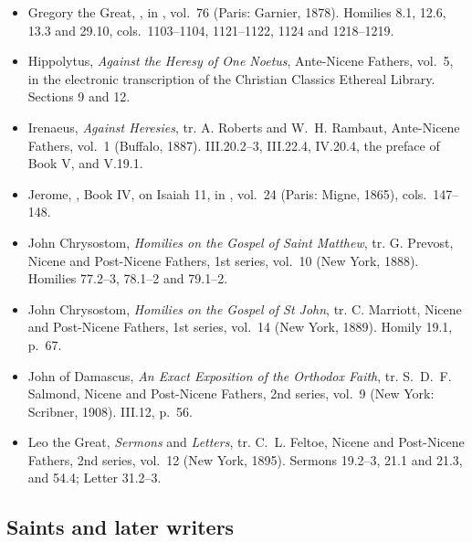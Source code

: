 \begin{itemize}[leftmargin=1.3em, itemsep=0.3em]
Oration 45, 9.
\item Gregory the Great, , in , vol.~76
(Paris: Garnier, 1878). Homilies 8.1, 12.6, 13.3 and 29.10, cols.~1103--1104, 1121--1122, 1124 and
1218--1219.
\item Hippolytus, \textit{Against the Heresy of One Noetus}, Ante-Nicene Fathers, vol.~5, in the
electronic transcription of the Christian Classics Ethereal Library. Sections 9 and 12.
\item Irenaeus, \textit{Against Heresies}, tr. A. Roberts and W.~H. Rambaut, Ante-Nicene Fathers,
vol.~1 (Buffalo, 1887). III.20.2--3, III.22.4, IV.20.4, the preface of Book V, and V.19.1.
\item Jerome, , Book IV, on Isaiah 11, in ,
vol.~24 (Paris: Migne, 1865), cols.~147--148.
\item John Chrysostom, \textit{Homilies on the Gospel of Saint Matthew}, tr. G. Prevost, Nicene and
Post-Nicene Fathers, 1st series, vol.~10 (New York, 1888). Homilies 77.2--3, 78.1--2 and 79.1--2.
\item John Chrysostom, \textit{Homilies on the Gospel of St John}, tr. C. Marriott, Nicene and
Post-Nicene Fathers, 1st series, vol.~14 (New York, 1889). Homily 19.1, p.~67.
\item John of Damascus, \textit{An Exact Exposition of the Orthodox Faith}, tr. S.~D.~F. Salmond,
Nicene and Post-Nicene Fathers, 2nd series, vol.~9 (New York: Scribner, 1908). III.12, p.~56.
\item Leo the Great, \textit{Sermons} and \textit{Letters}, tr. C.~L. Feltoe, Nicene and
Post-Nicene Fathers, 2nd series, vol.~12 (New York, 1895). Sermons 19.2--3, 21.1 and 21.3, and
54.4; Letter 31.2--3.
\end{itemize}

\subsection{Saints and later writers}

